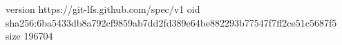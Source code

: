 version https://git-lfs.github.com/spec/v1
oid sha256:6ba5433db8a792cf9859ab7dd2fd389e64be882293b77547f7ff2ce51c5687f5
size 196704

